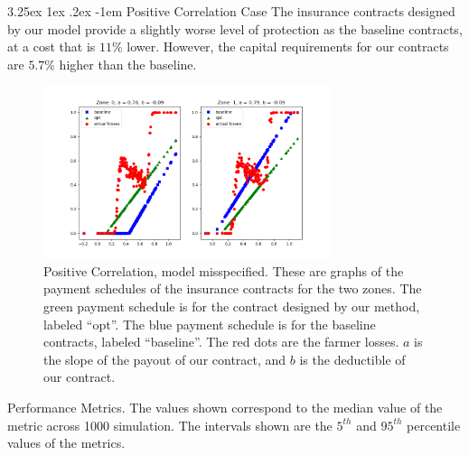 \documentclass[11pt]{article}
\makeatletter
\renewcommand\paragraph{\@startsection{paragraph}{5}{\z@}%
  {3.25ex \@plus1ex \@minus.2ex}%
  {-1em}%
  {\normalfont\normalsize\bfseries}}
\makeatother
\begin{document}
        \paragraph{Positive Correlation Case} The insurance contracts designed by our model provide a slightly worse level of protection as the baseline contracts, at a cost that is $11\%$ lower. However, the capital requirements for our contracts are $5.7\%$ higher than the baseline. 
        \begin{figure}[H]
            \centering
            \includegraphics[width=0.75\textwidth]{../../output/figures/Logit_Bootstrap/pos_corr_nonlinear_premium.png}
            \caption{Positive Correlation, model misspecified. These are graphs of the payment schedules of the insurance contracts for the two zones. The green payment schedule is for the contract designed by our method, labeled ``opt''. The blue payment schedule is for the baseline contracts, labeled ``baseline''. The red dots are the farmer losses. $a$ is the slope of the payout of our contract, and $b$ is the deductible of our contract.}
        \end{figure}

        \begin{table}[H]
            \centering
            
            
            \caption{Performance Metrics. The values shown correspond to the median value of the metric across 1000 simulation. The intervals shown are the $5^{th}$ and $95^{th}$ percentile values of the metrics.}
        \end{table}
        \FloatBarrier
\end{document}

